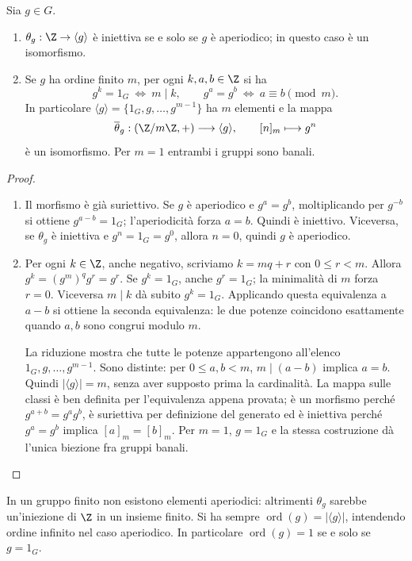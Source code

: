 \begin{proposizione}\label{prop:ordine-potenze}
Sia $g\in G$.
\begin{enumerate}[label=\arabic*.]
\item $\theta_g:\Z\to\langle g\rangle$ è iniettiva se e solo se $g$ è aperiodico; in questo caso è un isomorfismo.
\item Se $g$ ha ordine finito $m$, per ogni $k,a,b\in\Z$ si ha
\[
g^k=1_G\ \Longleftrightarrow\ m\mid k,
\qquad
g^a=g^b\ \Longleftrightarrow\ a\equiv b\pmod m.
\]
In particolare $\langle g\rangle=\{1_G,g,\ldots,g^{m-1}\}$ ha $m$ elementi e la mappa
\[
\overline\theta_g:(\Z/m\Z,+)\longrightarrow\langle g\rangle,
\qquad[n]_m\longmapsto g^n
\]
è un isomorfismo. Per $m=1$ entrambi i gruppi sono banali.
\end{enumerate}
\end{proposizione}
\begin{proof}
\begin{enumerate}[label=\arabic*.]
\item Il morfismo è già suriettivo. Se $g$ è aperiodico e $g^a=g^b$, moltiplicando per $g^{-b}$ si ottiene $g^{a-b}=1_G$; l'aperiodicità forza $a=b$. Quindi è iniettivo. Viceversa, se $\theta_g$ è iniettiva e $g^n=1_G=g^0$, allora $n=0$, quindi $g$ è aperiodico.
\item Per ogni $k\in\Z$, anche negativo, scriviamo $k=mq+r$ con $0\le r<m$. Allora $g^k=(g^m)^qg^r=g^r$. Se $g^k=1_G$, anche $g^r=1_G$; la minimalità di $m$ forza $r=0$. Viceversa $m\mid k$ dà subito $g^k=1_G$. Applicando questa equivalenza a $a-b$ si ottiene la seconda equivalenza: le due potenze coincidono esattamente quando $a,b$ sono congrui modulo $m$.

La riduzione mostra che tutte le potenze appartengono all'elenco $1_G,g,\ldots,g^{m-1}$. Sono distinte: per $0\le a,b<m$, $m\mid(a-b)$ implica $a=b$. Quindi $|\langle g\rangle|=m$, senza aver supposto prima la cardinalità. La mappa sulle classi è ben definita per l'equivalenza appena provata; è un morfismo perché $g^{a+b}=g^ag^b$, è suriettiva per definizione del generato ed è iniettiva perché $g^a=g^b$ implica $[a]_m=[b]_m$. Per $m=1$, $g=1_G$ e la stessa costruzione dà l'unica biezione fra gruppi banali.
\end{enumerate}
\end{proof}

\begin{osservazione}
In un gruppo finito non esistono elementi aperiodici: altrimenti $\theta_g$ sarebbe un'iniezione di $\Z$ in un insieme finito. Si ha sempre $\operatorname{ord}(g)=|\langle g\rangle|$, intendendo ordine infinito nel caso aperiodico. In particolare $\operatorname{ord}(g)=1$ se e solo se $g=1_G$.
\end{osservazione}

